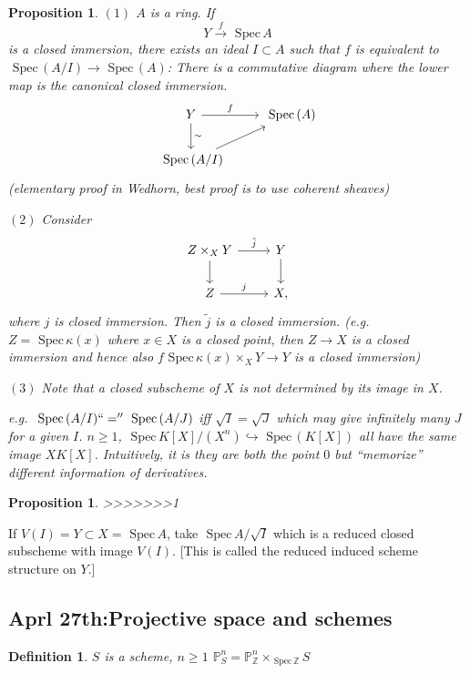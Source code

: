 \documentclass[11pt]{article}
\newtheorem{prop}[thm]{Proposition}
\newtheorem{dfn}[thm]{Definition}
\newcommand{\spec}{\text{ Spec}\,}
\newcommand{\proj}{\mathbb P}
\newcommand{\intg}{\mathbb Z}
\newcommand{\lrta}{\longrightarrow}
\newcommand{\inj}{\hookrightarrow}
\begin{document}
\begin{prop}
$(1)$
$A$ is a ring. If 
$$
Y\overset{f}{\lrta} \spec A
$$ 
is a closed immersion, there exists an ideal $I\subset A$ such that $f$ is equivalent to $\spec(A/I)\lrta \spec (A)$: There is a commutative diagram where the lower map is the canonical closed immersion.
$$
\begin{tikzcd}
Y \arrow[r, "f"] \arrow[d, "\sim"] & \spec(A) \\
\spec(A/I) \arrow[ru] & 
\end{tikzcd}
$$
(elementary proof in Wedhorn, best proof is to use coherent sheaves)

$(2)$ Consider
$$
\begin{tikzcd}
Z\times_X Y \arrow[r, "\tilde{j}"] \arrow[d] & Y \arrow[d] \\
Z \arrow[r, "j"] & X,
\end{tikzcd}
$$ 
where $j$ is closed immersion. Then $\tilde{j}$ is a closed immersion. (e.g. $Z=\spec \kappa(x)$ where $x\in X$ is a closed point, then $Z\lrta X$ is a closed immersion and hence also $f\spec \kappa(x)\times_X Y\lrta Y$ is a closed immersion)

$(3)$ Note that a closed subscheme of $X$ is not determined by its image in $X$.

e.g. $\spec(A/I)``=''\spec (A/J)$ iff $\sqrt{I}=\sqrt{J}$ which may give  infinitely many $J$ for  a given $I$.
$n\geq 1$, $\spec K[X]/(X^n)\inj \spec(K[X])$ all have the same image $XK[X]$. Intuitively, it is they are both the point $0$ but ``memorize'' different information of derivatives.
\end{prop}

\begin{prop}
>>>>>>>1
\end{prop}
If $V(I)=Y\subset X=\spec A$, take $\spec A/\sqrt{I}$ which is a reduced closed subscheme with image $V(I)$. [This is called the reduced induced scheme structure on $Y$.]

\subsection{Aprl 27th:Projective space and schemes}
\begin{dfn}
$S$ is a scheme, $n\geq 1$ $\proj^n_S=\proj^n_\intg\times_{\spec \intg} S$
\end{dfn}
\end{document}
